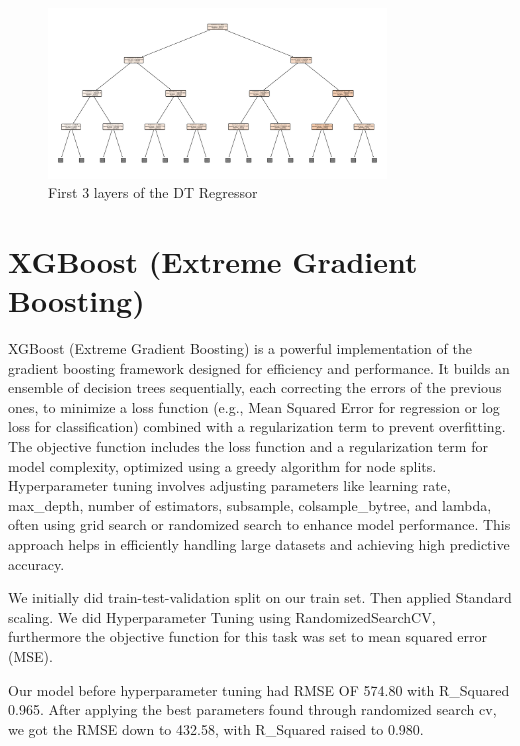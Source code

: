 \documentclass[12pt]{report}
\begin{document}
\begin{figure}[H] %
    \centering
    \includegraphics[width=0.8\textwidth]{dt.png} %
    \caption{First 3 layers of the DT Regressor} %
    \label{fig:dt} %
\end{figure}


\section{XGBoost (Extreme Gradient Boosting)}

XGBoost (Extreme Gradient Boosting) is a powerful implementation of the gradient boosting framework designed for efficiency and performance. It builds an ensemble of decision trees sequentially, each correcting the errors of the previous ones, to minimize a loss function (e.g., Mean Squared Error for regression or log loss for classification) combined with a regularization term to prevent overfitting. The objective function includes the loss function and a regularization term for model complexity, optimized using a greedy algorithm for node splits. Hyperparameter tuning involves adjusting parameters like learning rate, max\_depth, number of estimators, subsample, colsample\_bytree, and lambda, often using grid search or randomized search to enhance model performance. This approach helps in efficiently handling large datasets and achieving high predictive accuracy.

We initially did train-test-validation split on our train set. Then applied Standard scaling.
We did Hyperparameter Tuning using RandomizedSearchCV, furthermore the objective function for this task was set to mean squared error (MSE). 

Our model before hyperparameter tuning had RMSE OF 574.80 with R\_Squared 0.965. After applying the best parameters found through randomized search cv, we got the RMSE down to 432.58, with R\_Squared raised to 0.980.
\end{document}
